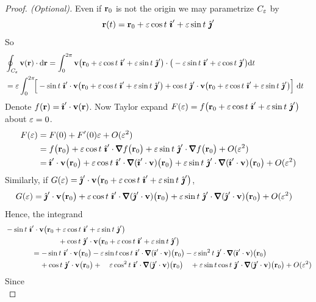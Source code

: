 \begin{proof}[Proof. (Optional)]
{Even if $\mathbf{r}_0$ is not the origin we may parametrize $C_\varepsilon$ by
\begin{equation*}
\vr(t)=\vr_0+\veps\cos t\ \hi'+\veps\sin t\ \hj'
\end{equation*}
So
\begin{align*}
&\oint_{C_\veps} \vv(\vr)\cdot \dee{\vr}
=\int_0^{2\pi} \vv\big(\vr_0+\veps\cos t\ \hi'+\veps\sin t\ \hj'\big)
\cdot\big(-\veps\sin t\ \hi'+\veps\cos t\ \hj'\big) \dee{t}\cr
&=\veps\int_0^{2\pi} \!\!\Big[
-\sin t\ \hi'\cdot\vv\big(\vr_0+\veps\cos t\ \hi'+\veps\sin t\ \hj'\big)
+\cos t\ \hj'\cdot\vv\big(\vr_0+\veps\cos t\ \hi'+\veps\sin t\ \hj'\big)\Big]\
\dee{t}
\end{align*}
Denote $f(\mathbf{r})=\hat{\pmb{\imath}}'\cdot\mathbf{v}(\mathbf{r})$.
Now Taylor expand 
$F(\veps)=f\big(\vr_0+\veps\cos t\ \hi'+\veps\sin t\ \hj'\big)$
about $\varepsilon=0$.
\begin{align*}
F(\veps)&=F(0)+F'(0)\veps +O(\veps^2)\\
&=f\big(\vr_0\big)
+\veps\cos t\ \hi'\cdot\vnabla f\big(\vr_0\big)
+\veps\sin t\ \hj'\cdot\vnabla f\big(\vr_0\big) +O(\veps^2)\\
&=\hi'\cdot\vv\big(\vr_0\big)
+\veps\cos t\ \hi'\cdot\vnabla(\hi'\cdot\vv)\big(\vr_0\big)
+\veps\sin t\ \hj'\cdot\vnabla(\hi'\cdot\vv)\big(\vr_0\big) +O(\veps^2)
\end{align*}
Similarly, if $G(\veps)=\hj'\cdot\vv\big(\vr_0+\veps\cos t\ \hi'+\veps\sin t\ \hj'\big)$,
\begin{align*}
G(\veps)
&=\hj'\cdot\vv\big(\vr_0\big)
+\veps\cos t\ \hi'\cdot\vnabla(\hj'\cdot\vv)\big(\vr_0\big)
+\veps\sin t\ \hj'\cdot\vnabla(\hj'\cdot\vv)\big(\vr_0\big) +O(\veps^2)\cr
\end{align*}
Hence, the integrand
\begin{align*}
&-\sin t\ \hi'\cdot\vv\big(\vr_0+\veps\cos t\ \hi'+\veps\sin t\ \hj'\big) 
   \\&\hskip1in
+\cos t\ \hj'\cdot\vv\big(\vr_0+\veps\cos t\ \hi'+\veps\sin t\ \hj'\big)
\\
&\hskip0.5in= -\sin t\ \hi'\cdot\vv\big(\vr_0\big)
-\veps\sin t\cos t\ \hi'\cdot\vnabla(\hi'\cdot\vv)\big(\vr_0\big)
 -\veps\sin^2 t\ \hj'\cdot\vnabla(\hi'\cdot\vv)\big(\vr_0\big)
   \\&\hskip0.5in\phantom{=\ }
+\cos t\ \hj'\cdot\vv\big(\vr_0\big)
+\ \ \ \veps\cos^2 t\ \hi'\cdot\vnabla(\hj'\cdot\vv)\big(\vr_0\big)\ \ \ 
+\veps\sin t\cos t\ \hj'\cdot\vnabla(\hj'\cdot\vv)\big(\vr_0\big)+O(\veps^2)
\end{align*}
Since
\begin{equation*}

\end{equation*}}
\end{proof}
